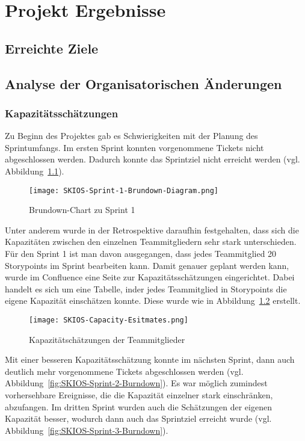 
\chapter{Projekt Ergebnisse}

\section{Erreichte Ziele}

\section{Analyse der Organisatorischen Änderungen}

\subsection{Kapazitätsschätzungen}

Zu Beginn des Projektes gab es Schwierigkeiten mit der Planung des Sprintumfangs.
Im ersten Sprint konnten vorgenommene Tickets nicht abgeschlossen werden. 
Dadurch konnte das Sprintziel nicht erreicht werden (vgl. Abbildung~\ref{fig:SKIOS-Sprint-1-Brundown}).

\begin{figure}[h]
    \texttt{[image: SKIOS-Sprint-1-Brundown-Diagram.png]}
    \caption{Brundown-Chart zu Sprint 1}
    \label{fig:SKIOS-Sprint-1-Brundown}
\end{figure}

Unter anderem wurde in der Retrospektive daraufhin festgehalten, 
dass sich die Kapazitäten zwischen den einzelnen Teammitgliedern sehr stark unterschieden.
Für den Sprint 1 ist man davon ausgegangen, dass jedes Teammitglied 20 Storypoints im Sprint bearbeiten kann.
Damit genauer geplant werden kann, wurde im Confluence eine Seite zur Kapazitätsschätzungen eingerichtet. 
Dabei handelt es sich um eine Tabelle, inder jedes Teammitglied in Storypoints die eigene Kapazität einschätzen konnte.
Diese wurde wie in Abbildung~\ref{fig:Capacitytable} erstellt. 

\begin{figure}[h]
    \texttt{[image: SKIOS-Capacity-Esitmates.png]}
    \caption{Kapazitätschätzungen der Teammitglieder}
    \label{fig:Capacitytable}
\end{figure}

Mit einer besseren Kapazitätsschätzung konnte im nächsten Sprint, dann auch deutlich mehr vorgenommene Tickets abgeschlossen werden (vgl. Abbildung~\ref{fig:SKIOS-Sprint-2-Burndown}).
Es war möglich zumindest vorhersehbare Ereignisse, die die Kapazität einzelner stark einschränken, abzufangen.
Im dritten Sprint wurden auch die Schätzungen der eigenen Kapazität besser, wodurch dann auch das Sprintziel erreicht wurde (vgl. Abbildung~\ref{fig:SKIOS-Sprint-3-Burndown}).

